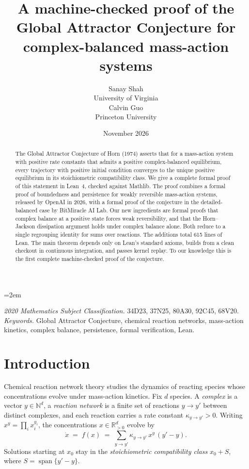 \documentclass[11pt]{article}
\title{A machine-checked proof of the Global Attractor Conjecture for complex-balanced mass-action systems}
\author{Sanay Shah\\ University of Virginia \\[1.2em] Calvin Guo\\ Princeton University}
\date{November 2026}
\newcommand{\N}{\mathbb{N}}
\newcommand{\Rpos}{\mathbb{R}^{d}_{>0}}
\theoremstyle{plain}
\theoremstyle{definition}
\theoremstyle{remark}
\begin{document}
\emergencystretch=2em
\maketitle

\begin{abstract}
The Global Attractor Conjecture of Horn (1974) asserts that for a mass-action system with positive rate constants that admits a positive complex-balanced equilibrium, every trajectory with positive initial condition converges to the unique positive equilibrium in its stoichiometric compatibility class. We give a complete formal proof of this statement in Lean~4, checked against Mathlib. The proof combines a formal proof of boundedness and persistence for weakly reversible mass-action systems, released by OpenAI in 2026, with a formal proof of the conjecture in the detailed-balanced case by BitMiracle AI Lab. Our new ingredients are formal proofs that complex balance at a positive state forces weak reversibility, and that the Horn--Jackson dissipation argument holds under complex balance alone. Both reduce to a single regrouping identity for sums over reactions. The additions total 615 lines of Lean. The main theorem depends only on Lean's standard axioms, builds from a clean checkout in continuous integration, and passes kernel replay. To our knowledge this is the first complete machine-checked proof of the conjecture.
\end{abstract}

\noindent\textit{2020 Mathematics Subject Classification.} 34D23, 37N25, 80A30, 92C45, 68V20.\\
\textit{Keywords.} Global Attractor Conjecture, chemical reaction networks, mass-action kinetics, complex balance, persistence, formal verification, Lean.

\section{Introduction}

Chemical reaction network theory studies the dynamics of reacting species whose concentrations evolve under mass-action kinetics. Fix $d$ species. A \emph{complex} is a vector $y \in \N^d$, a \emph{reaction network} is a finite set of reactions $y \to y'$ between distinct complexes, and each reaction carries a rate constant $\kappa_{y \to y'} > 0$. Writing $x^y = \prod_i x_i^{y_i}$, the concentrations $x \in \Rpos$ evolve by
\begin{equation}\label{eq:ma}
\dot x \;=\; f(x) \;=\; \sum_{y \to y'} \kappa_{y\to y'}\, x^{y}\,(y' - y).
\end{equation}
Solutions starting at $x_0$ stay in the \emph{stoichiometric compatibility class} $x_0 + S$, where $S = \operatorname{span}\{y' - y\}$.
\end{document}
